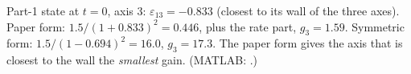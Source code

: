
\begin{toybox}
Part-1 state at $t=0$, axis 3: $\varepsilon_{13}=-0.833$ (closest to its wall of the three axes). Paper form:
$1.5/(1+0.833)^2=0.446$, plus the rate part, $g_3=1.59$. Symmetric form: $1.5/(1-0.694)^2=16.0$, $g_3=17.3$. The paper form
gives the axis that is closest to the wall the \emph{smallest} gain. (MATLAB: .)
\end{toybox}
